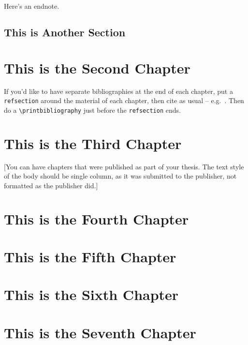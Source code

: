 \documentclass[12pt]{caltech_thesis}
\begin{document}
\lipsum[3] 

\lipsum[4-5]

Here's an endnote.

\section{This is Another Section}
\lipsum[6-7]

\chapter{This is the Second Chapter}
\begin{refsection}
If you'd like to have separate bibliographies at the end of each chapter, put a \verb|refsection| around the material of each chapter, then cite as usual -- e.g.~\citep{GMP81,Ful83}. Then do a \verb|\printbibliography| just before the \verb|refsection| ends. 

\printbibliography[heading=subbibliography]
\end{refsection}


\chapter{This is the Third Chapter}


[You can have chapters that were published as part of your thesis. The text style of the body should be single column, as it was submitted to the publisher, not formatted as the publisher did.]

\chapter{This is the Fourth Chapter}
\chapter{This is the Fifth Chapter}
\chapter{This is the Sixth Chapter}
\chapter{This is the Seventh Chapter}
\end{document}
